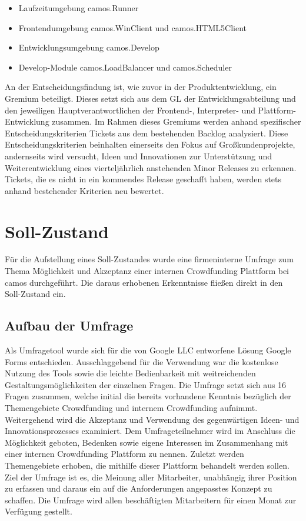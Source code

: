 \begin{itemize}
	\item Laufzeitumgebung camos.Runner
	\item Frontendumgebung camos.WinClient und camos.HTML5Client
	\item Entwicklungsumgebung camos.Develop
	\item Develop-Module camos.LoadBalancer und camos.Scheduler
\end{itemize}

An der Entscheidungsfindung ist, wie zuvor in der Produktentwicklung, ein Gremium beteiligt. Dieses setzt sich aus dem \ac{GL} der Entwicklungsabteilung und den jeweiligen Hauptverantwortlichen der Frontend-, Interpreter- und Plattform-Entwicklung zusammen. Im Rahmen dieses Gremiums werden anhand spezifischer Entscheidungskriterien Tickets aus dem bestehenden Backlog analysiert. Diese Entscheidungskriterien beinhalten einerseits den Fokus auf Großkundenprojekte, andernseits wird versucht, Ideen und Innovationen zur Unterstützung und Weiterentwicklung eines vierteljährlich anstehenden Minor Releases zu erkennen. Tickets, die es nicht in ein kommendes Release geschafft haben, werden stets anhand bestehender Kriterien neu bewertet.

\section{Soll-Zustand}
Für die Aufstellung eines Soll-Zustandes wurde eine firmeninterne Umfrage zum Thema \glqq Möglichkeit und Akzeptanz einer internen Crowdfunding Plattform bei camos\grqq{} durchgeführt. Die daraus erhobenen Erkenntnisse fließen direkt in den Soll-Zustand ein.

\subsection{Aufbau der Umfrage}\label{sec:AufbauUmfrage}
Als Umfragetool wurde sich für die von Google LLC entworfene Lösung Google Forms entschieden. Ausschlaggebend für die Verwendung war die kostenlose Nutzung des Tools sowie die leichte Bedienbarkeit mit weitreichenden Gestaltungsmöglichkeiten der einzelnen Fragen. Die Umfrage setzt sich aus 16 Fragen zusammen, welche initial die bereits vorhandene Kenntnis bezüglich der Themengebiete Crowdfunding und internem Crowdfunding aufnimmt. Weitergehend wird die Akzeptanz und Verwendung des gegenwärtigen Ideen- und Innovationsprozesses examiniert. Dem Umfrageteilnehmer wird im Anschluss die Möglichkeit geboten, Bedenken sowie eigene Interessen im Zusammenhang mit einer internen Crowdfunding Plattform zu nennen. Zuletzt werden Themengebiete erhoben, die mithilfe dieser Plattform behandelt werden sollen. Ziel der Umfrage ist es, die Meinung aller Mitarbeiter, unabhängig ihrer Position zu erfassen und daraus ein auf die Anforderungen angepasstes Konzept zu schaffen. Die Umfrage wird allen beschäftigten Mitarbeitern für einen Monat zur Verfügung gestellt.

